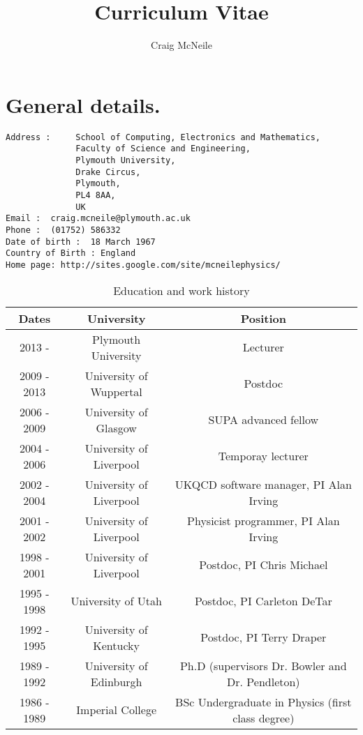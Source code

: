 \documentclass[12pt]{article}
\begin{document}
\title{Curriculum Vitae}

\author{Craig McNeile}

\maketitle

\section{General details.}
\begin{verbatim}
Address :     School of Computing, Electronics and Mathematics,
              Faculty of Science and Engineering,
              Plymouth University,
              Drake Circus,
              Plymouth,
              PL4 8AA,
              UK             
Email :  craig.mcneile@plymouth.ac.uk
Phone :  (01752) 586332
Date of birth :  18 March 1967
Country of Birth : England
Home page: http://sites.google.com/site/mcneilephysics/
\end{verbatim}

%

\begin{table}[tb]
\centering
\begin{tabular}{|c|c|c|} \hline
Dates & University  &  Position \\  \hline
2013 -  & Plymouth University  & Lecturer \\
2009 - 2013 & University of Wuppertal & Postdoc \\
2006 - 2009 & University of Glasgow & SUPA advanced fellow \\
2004 - 2006 & University of Liverpool & Temporay lecturer \\
2002 - 2004 & University of Liverpool & UKQCD software manager, PI Alan Irving \\
2001 - 2002 & University of Liverpool & Physicist programmer, PI Alan Irving \\
1998 - 2001 & University of Liverpool & Postdoc, PI Chris Michael \\
1995 - 1998 & University of Utah & Postdoc, PI Carleton DeTar \\
1992 - 1995 & University of Kentucky & Postdoc, PI Terry Draper \\
1989 - 1992 & University of Edinburgh & Ph.D (supervisors Dr. Bowler and Dr. Pendleton) \\ 
1986 - 1989 & Imperial College & BSc Undergraduate in Physics (first class degree) \\
\hline
\end{tabular}
\label{tb:life}
\caption{Education and work history}
\end{table}
\end{document}
